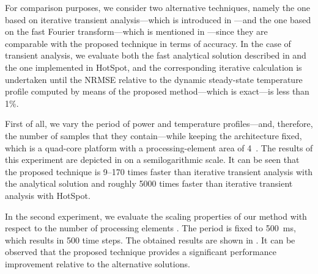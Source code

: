 For comparison purposes, we consider two alternative techniques, namely the one
based on iterative transient analysis---which is introduced in
---and the one based on the fast Fourier
transform---which is mentioned in ---since they
are comparable with the proposed technique in terms of accuracy. In the case of
transient analysis, we evaluate both the fast analytical solution described in
 and the one implemented in HotSpot, and the
corresponding iterative calculation is undertaken until the \ac{NRMSE} relative
to the dynamic steady-state temperature profile computed by means of the
proposed method---which is exact---is less than 1\%.

First of all, we vary the period \period of power and temperature
profiles---and, therefore, the number of samples \ns that they contain---while
keeping the architecture fixed, which is a quad-core platform with a
processing-element area of 4~. The results of this experiment are
depicted in  on a semilogarithmic scale.
It can be seen that the proposed technique is 9--170 times faster than iterative
transient analysis with the analytical solution and roughly 5000 times faster
than iterative transient analysis with HotSpot.

In the second experiment, we evaluate the scaling properties of our method with
respect to the number of processing elements \np. The period is fixed to 500~ms,
which results in 500 time steps. The obtained results are shown in
. It can be observed that the proposed
technique provides a significant performance improvement relative to the
alternative solutions.

